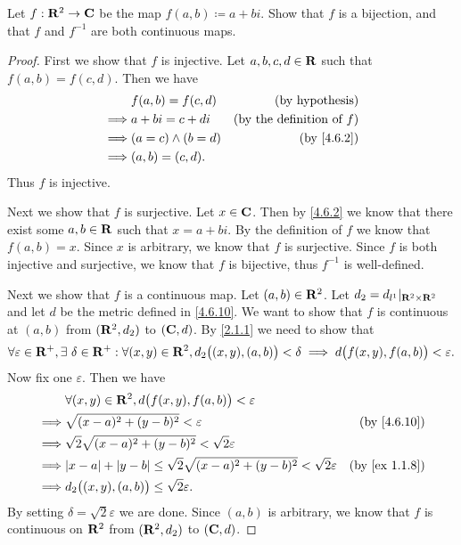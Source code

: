 \begin{exercise}\label{ex 4.6.11}
  Let \(f : \mathbf{R}^2 \to \mathbf{C}\) be the map \(f(a, b) \coloneqq a + bi\).
  Show that \(f\) is a bijection, and that \(f\) and \(f^{-1}\) are both continuous maps.
\end{exercise}

\begin{proof}
  First we show that \(f\) is injective.
  Let \(a, b, c, d \in \mathbf{R}\) such that \(f(a, b) = f(c, d)\).
  Then we have
  \begin{align*}
             & f(a, b) = f(c, d)     & \text{(by hypothesis)}              \\
    \implies & a + bi = c + di       & \text{(by the definition of \(f\))} \\
    \implies & (a = c) \land (b = d) & \text{(by \cref{4.6.2})}            \\
    \implies & (a, b) = (c, d).
  \end{align*}
  Thus \(f\) is injective.

  Next we show that \(f\) is surjective.
  Let \(x \in \mathbf{C}\).
  Then by \cref{4.6.2} we know that there exist some \(a, b \in \mathbf{R}\) such that \(x = a + bi\).
  By the definition of \(f\) we know that \(f(a, b) = x\).
  Since \(x\) is arbitrary, we know that \(f\) is surjective.
  Since \(f\) is both injective and surjective, we know that \(f\) is bijective, thus \(f^{-1}\) is well-defined.

  Next we show that \(f\) is a continuous map.
  Let \((a, b) \in \mathbf{R}^2\).
  Let \(d_2 = d_{l^1}|_{\mathbf{R}^2 \times \mathbf{R}^2}\) and let \(d\) be the metric defined in \cref{4.6.10}.
  We want to show that \(f\) is continuous at \((a, b)\) from \((\mathbf{R}^2, d_2)\) to \((\mathbf{C}, d)\).
  By \cref{2.1.1} we need to show that
  \[
    \forall \varepsilon \in \mathbf{R}^+, \exists\ \delta \in \mathbf{R}^+ : \forall (x, y) \in \mathbf{R}^2, d_2\big((x, y), (a, b)\big) < \delta \implies d\big(f(x, y), f(a, b)\big) < \varepsilon.
  \]
  Now fix one \(\varepsilon\).
  Then we have
  \begin{align*}
             & \forall (x, y) \in \R^2, d\big(f(x, y), f(a, b)\big) < \varepsilon                                                        \\
    \implies & \sqrt{(x - a)^2 + (y - b)^2} < \varepsilon                                                  & \text{(by \cref{4.6.10})}   \\
    \implies & \sqrt{2} \sqrt{(x - a)^2 + (y - b)^2} < \sqrt{2} \varepsilon                                                              \\
    \implies & \abs{x - a} + \abs{y - b} \leq \sqrt{2} \sqrt{(x - a)^2 + (y - b)^2} < \sqrt{2} \varepsilon & \text{(by \cref{ex 1.1.8})} \\
    \implies & d_2\big((x, y), (a, b)\big) \leq \sqrt{2} \varepsilon.
  \end{align*}
  By setting \(\delta = \sqrt{2} \varepsilon\) we are done.
  Since \((a, b)\) is arbitrary, we know that \(f\) is continuous on \(\mathbf{R}^2\) from \((\mathbf{R}^2, d_2)\) to \((\mathbf{C}, d)\).


\end{proof}
